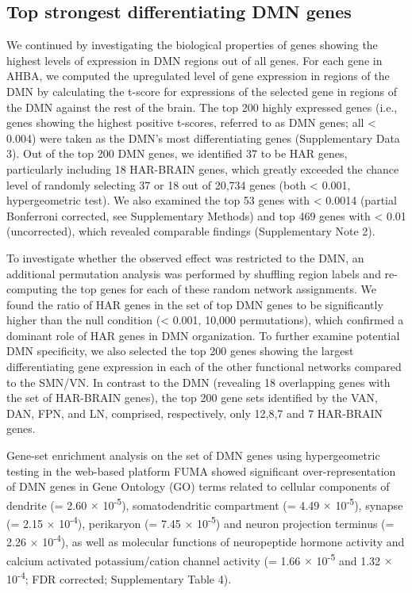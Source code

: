 \begin{refsection}
\subsection*{Top strongest differentiating DMN genes}
We continued by investigating the biological properties of genes showing the highest levels of expression in DMN regions out of all genes. For each gene in AHBA, we computed the upregulated level of gene expression in regions of the DMN by calculating the t-score for expressions of the selected gene in regions of the DMN against the rest of the brain. The top 200 highly expressed genes (i.e., genes showing the highest positive t-scores, referred to as DMN genes; all \pval < 0.004) were taken as the DMN’s most differentiating genes (Supplementary Data 3). Out of the top 200 DMN genes, we identified 37 to be HAR genes, particularly including 18 HAR-BRAIN genes, which greatly exceeded the chance level of randomly selecting 37 or 18 out of 20,734 genes (both \pval < 0.001, hypergeometric test). We also examined the top 53 genes with \pval < 0.0014 (partial Bonferroni corrected, see Supplementary Methods) and top 469 genes with \pval < 0.01 (uncorrected), which revealed comparable findings (Supplementary Note 2).

To investigate whether the observed effect was restricted to the DMN, an additional permutation analysis was performed by shuffling region labels and re-computing the top genes for each of these random network assignments. We found the ratio of HAR genes in the set of top DMN genes to be significantly higher than the null condition (\pval < 0.001, 10,000 permutations), which confirmed a dominant role of HAR genes in DMN organization. To further examine potential DMN specificity, we also selected the top 200 genes showing the largest differentiating gene expression in each of the other functional networks compared to the SMN/VN. In contrast to the DMN (revealing 18 overlapping genes with the set of HAR-BRAIN genes), the top 200 gene sets identified by the VAN, DAN, FPN, and LN, comprised, respectively, only 12,8,7 and 7 HAR-BRAIN genes.

Gene-set enrichment analysis on the set of DMN genes using hypergeometric testing in the web-based platform FUMA \citep{watanabe2017functional} showed significant over-representation of DMN genes in Gene Ontology (GO) terms related to cellular components of dendrite (\pval = 2.60 $\times$ 10\textsuperscript{-5}), somatodendritic compartment (\pval = 4.49 $\times$ 10\textsuperscript{-5}), synapse (\pval = 2.15 $\times$ 10\textsuperscript{-4}), perikaryon (\pval = 7.45 $\times$ 10\textsuperscript{-5}) and neuron projection terminus (\pval = 2.26 $\times$ 10\textsuperscript{-4}), as well as molecular functions of neuropeptide hormone activity and calcium activated potassium/cation channel activity (\pval = 1.66 $\times$ 10\textsuperscript{-5} and 1.32 $\times$ 10\textsuperscript{-4}; FDR corrected; Supplementary Table 4).


\end{refsection}
